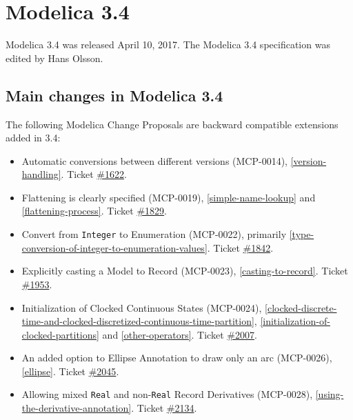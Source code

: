\section{Modelica 3.4}\label{modelica-3-4}
Modelica 3.4 was released April 10, 2017. The Modelica 3.4 specification
was edited by Hans Olsson.

\subsection{Main changes in Modelica 3.4}\label{main-changes-in-modelica-3-4}

The following Modelica Change Proposals are backward compatible
extensions added in 3.4:
\begin{itemize}
\item
  Automatic conversions between different versions (MCP-0014),
  \cref{version-handling}. Ticket
  \href{https://github.com/modelica/ModelicaSpecification/issues/1622}{\#1622}.
\item
  Flattening is clearly specified (MCP-0019), \cref{simple-name-lookup} and \cref{flattening-process}.
  Ticket \href{https://github.com/modelica/ModelicaSpecification/issues/1829}{\#1829}.
\item
  Convert from \lstinline!Integer! to Enumeration (MCP-0022), primarily \cref{type-conversion-of-integer-to-enumeration-values}.
  Ticket \href{https://github.com/modelica/ModelicaSpecification/issues/1842}{\#1842}.
\item
  Explicitly casting a Model to Record (MCP-0023), \cref{casting-to-record}.
  Ticket \href{https://github.com/modelica/ModelicaSpecification/issues/1953}{\#1953}.
\item
  Initialization of Clocked Continuous States (MCP-0024),
  \cref{clocked-discrete-time-and-clocked-discretized-continuous-time-partition},
  \cref{initialization-of-clocked-partitions} and \cref{other-operators}. Ticket
  \href{https://github.com/modelica/ModelicaSpecification/issues/2007}{\#2007}.
\item
  An added option to Ellipse Annotation to draw only an arc (MCP-0026),
  \cref{ellipse}. Ticket
  \href{https://github.com/modelica/ModelicaSpecification/issues/2045}{\#2045}.
\item
  Allowing mixed \lstinline!Real! and non-\lstinline!Real! Record Derivatives (MCP-0028), \cref{using-the-derivative-annotation}.
  Ticket \href{https://github.com/modelica/ModelicaSpecification/issues/2134}{\#2134}.
\end{itemize}

